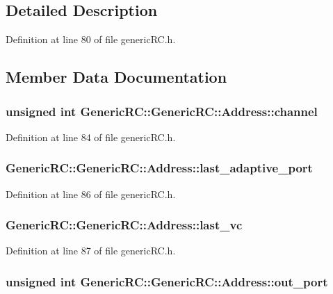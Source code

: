 \subsection{Detailed Description}


Definition at line 80 of file genericRC.h.

\subsection{Member Data Documentation}
\subsubsection[{channel}]{\setlength{\rightskip}{0pt plus 5cm}unsigned int GenericRC::GenericRC::Address::channel}\label{classGenericRC_1_1Address_6162a987605657957c612d1c42b5a20c}




Definition at line 84 of file genericRC.h.
\subsubsection[{last\_\-adaptive\_\-port}]{ GenericRC::GenericRC::Address::last\_\-adaptive\_\-port}\label{classGenericRC_1_1Address_164e344394200b4c484f99a3e4f7f87a}




Definition at line 86 of file genericRC.h.
\subsubsection[{last\_\-vc}]{ GenericRC::GenericRC::Address::last\_\-vc}\label{classGenericRC_1_1Address_5fbfdae708516894a8d8dbb2fa5df335}




Definition at line 87 of file genericRC.h.
\subsubsection[{out\_\-port}]{\setlength{\rightskip}{0pt plus 5cm}unsigned int GenericRC::GenericRC::Address::out\_\-port}\label{classGenericRC_1_1Address_b94b171d3ded7927ec3eb7ea73bababd}




